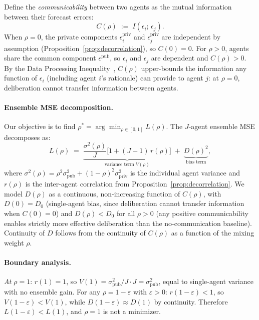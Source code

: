 \documentclass[11pt]{article}
\theoremstyle{plain}
\theoremstyle{definition}
\begin{document}
  Define the \textit{communicability} between two agents as the mutual information
  between their forecast errors:
  \begin{equation}
  C(\rho) \;:=\; I(\epsilon_i;\, \epsilon_j).
  \end{equation}
  When $\rho = 0$, the private components $\epsilon_i^{\mathrm{priv}}$ and
  $\epsilon_j^{\mathrm{priv}}$ are independent by assumption
  (Proposition~\ref{prop:decorrelation}), so $C(0) = 0$.
  For $\rho > 0$, agents share the common component $\epsilon^{\mathrm{pub}}$,
  so $\epsilon_i$ and $\epsilon_j$ are dependent and $C(\rho) > 0$.
  By the Data Processing Inequality~\citep{shin2026reasoning}, $C(\rho)$
  upper-bounds the information any function of $\epsilon_i$ (including agent $i$'s
  rationale) can provide to agent $j$: at $\rho = 0$, deliberation cannot
  transfer information between agents.

  \paragraph{Ensemble MSE decomposition.}
  Our objective is to find $\rho^* = \arg\min_{\rho \in [0,1]} L(\rho)$.
  The $J$-agent ensemble MSE decomposes as:
  \begin{equation}
  L(\rho) \;=\; \underbrace{\frac{\sigma^2(\rho)}{J}\bigl[1+(J{-}1)\,r(\rho)\bigr]}_{\text{variance term } V(\rho)}
  \;+\; \underbrace{D(\rho)^2}_{\text{bias term}},
  \end{equation}
  where $\sigma^2(\rho) = \rho^2\sigma_{\mathrm{pub}}^2 + (1{-}\rho)^2\sigma_{\mathrm{priv}}^2$
  is the individual agent variance and $r(\rho)$ is the inter-agent correlation
  from Proposition~\ref{prop:decorrelation}.
  We model $D(\rho)$ as a continuous, non-increasing function of $C(\rho)$, with $D(0) = D_0$ (single-agent bias, since deliberation cannot transfer information when $C(0) = 0$) and $D(\rho) < D_0$ for all $\rho > 0$ (any positive communicability enables strictly more effective deliberation than the no-communication baseline). Continuity of $D$ follows from the continuity of $C(\rho)$ as a function of the mixing weight $\rho$.

  \paragraph{Boundary analysis.}
  \textit{At $\rho = 1$}: $r(1) = 1$, so
  $V(1) = \sigma_{\mathrm{pub}}^2/J \cdot J = \sigma_{\mathrm{pub}}^2$,
  equal to single-agent variance with no ensemble gain.
  For any $\rho = 1 - \varepsilon$ with $\varepsilon > 0$: $r(1{-}\varepsilon) < 1$,
  so $V(1{-}\varepsilon) < V(1)$, while $D(1{-}\varepsilon) \approx D(1)$ by continuity.
  Therefore $L(1{-}\varepsilon) < L(1)$, and $\rho = 1$ is not a minimizer.
\end{document}
